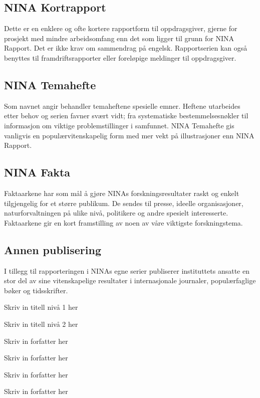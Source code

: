 \documentclass[11pt, a4paper]{article}
\begin{document}
\subsection*{\small{NINA Kortrapport}}
{\small Dette er en enklere og ofte kortere rapportform til oppdragsgiver, gjerne for prosjekt med mindre arbeidsomfang enn det som ligger til grunn for NINA Rapport. Det er ikke krav om sammendrag på engelsk. Rapportserien kan også benyttes til framdriftsrapporter eller foreløpige meldinger til oppdragsgiver.}

\subsection*{\small{NINA Temahefte}}
{\small Som navnet angir behandler temaheftene spesielle emner. Heftene utarbeides etter behov og serien favner svært vidt; fra systematiske bestemmelsesnøkler til informasjon om viktige problemstillinger i samfunnet. NINA Temahefte gis vanligvis en populærvitenskapelig form med mer vekt på illustrasjoner enn NINA Rapport.}

\subsection*{\small{NINA Fakta}}
{\small Faktaarkene har som mål å gjøre NINAs forskningsresultater raskt og enkelt tilgjengelig for et større publikum. De sendes til presse, ideelle organisasjoner, naturforvaltningen på ulike nivå, politikere og andre spesielt interesserte. Faktaarkene gir en kort framstilling av noen av våre viktigste forskningstema.}

\subsection*{\small{Annen publisering}}
{\small I tillegg til rapporteringen i NINAs egne serier publiserer instituttets ansatte en stor del av sine vitenskapelige resultater i internasjonale journaler, populærfaglige bøker og tidsskrifter.}

\clearpage
{}
\setcounter{page}{1}
\vspace{2cm}

\Huge{Skriv in titell nivå 1 her} \par\vspace{.5cm}
\huge{Skriv in titell nivå 2 her} \par\vspace{1cm}
\hspace{0cm}\LARGE{Skriv in forfatter her} \par
\hspace{0cm}\LARGE{Skriv in forfatter her} \par
\hspace{0cm}\LARGE{Skriv in forfatter her} \par
\hspace{0cm}\LARGE{Skriv in forfatter her} \par
\end{document}
